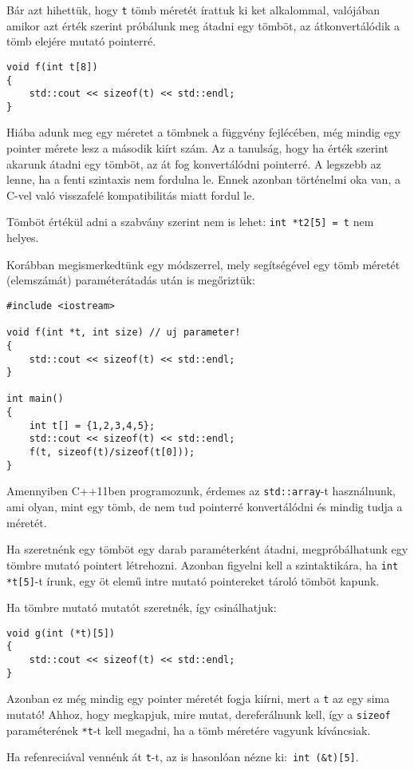 \documentclass[a4paper,11.5pt,table]{article}
\begin{document}
	Bár azt hihettük, hogy \texttt{t} tömb méretét írattuk ki ket alkalommal, valójában amikor azt érték szerint próbálunk meg átadni egy tömböt, az átkonvertálódik a tömb elejére mutató pointerré.
	\begin{lstlisting}
void f(int t[8])
{
	std::cout << sizeof(t) << std::endl;
}
	\end{lstlisting}
	Hiába adunk meg egy méretet a tömbnek a függvény fejlécében, még mindig egy pointer mérete lesz a második kiírt szám. Az a tanulság, hogy ha érték szerint akarunk átadni egy tömböt, az át fog konvertálódni pointerré. A legszebb az lenne, ha a fenti szintaxis nem fordulna le. Ennek azonban történelmi oka van, a C-vel való visszafelé kompatibilitás miatt fordul le. 
	\begin{note}
		Tömböt értékül adni a szabvány szerint nem is lehet: \texttt{int *t2[5] = t} nem helyes.
	\end{note}
	Korábban megismerkedtünk egy módszerrel, mely segítségével egy tömb méretét (elemszámát) paraméterátadás után is megőriztük:
	\begin{lstlisting}
#include <iostream>

void f(int *t, int size) // uj parameter!
{
	std::cout << sizeof(t) << std::endl;
}

int main()
{
	int t[] = {1,2,3,4,5};
	std::cout << sizeof(t) << std::endl;
	f(t, sizeof(t)/sizeof(t[0]));
}
	\end{lstlisting}
	\begin{note}
		Amennyiben C++11ben programozunk, érdemes az \texttt{std::array}-t használnunk, ami olyan, mint egy tömb, de nem tud pointerré konvertálódni és mindig tudja a méretét.
	\end{note}
	Ha szeretnénk egy tömböt egy darab paraméterként átadni, megpróbálhatunk egy tömbre mutató pointert létrehozni. Azonban figyelni kell a szintaktikára, ha \texttt{int *t[5]}-t írunk, egy öt elemű intre mutató pointereket tároló tömböt kapunk.
	
	\medskip
	Ha tömbre mutató mutatót szeretnék, így csinálhatjuk:
	\begin{lstlisting}
void g(int (*t)[5])
{
	std::cout << sizeof(t) << std::endl;
}
	\end{lstlisting}
	Azonban ez még mindig egy pointer méretét fogja kiírni, mert a \texttt{t} az egy sima mutató! Ahhoz, hogy megkapjuk, mire mutat, dereferálnunk kell, így a \texttt{sizeof} paraméterének \texttt{*t}-t kell megadni, ha a tömb méretére vagyunk kíváncsiak.
	\begin{note}
		Ha refenreciával vennénk át \texttt{t}-t, az is hasonlóan nézne ki:\, \texttt{int (\&t)[5]}.
	\end{note}
	\medskip
	
\end{document}
